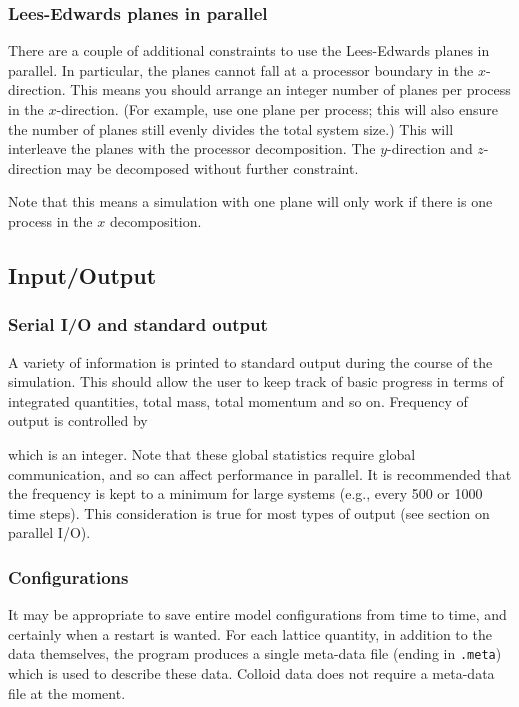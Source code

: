 \subsubsection{Lees-Edwards planes in parallel} 

There are a couple of additional constraints to use the Lees-Edwards
planes in parallel. In particular, the planes cannot fall at a
processor boundary in the $x$-direction. This means you should
arrange an integer number of planes per process in the $x$-direction.
(For example, use one plane per process; this will also ensure the number
of planes
still evenly divides the total system size.)
This will interleave the planes with the processor decomposition.
The $y$-direction and $z$-direction may be decomposed without
further constraint.

Note that this means a simulation with one plane will only work
if there is one process in the $x$ decomposition.

\subsection{Input/Output}

\subsubsection{Serial I/O and standard output}

A variety of information is printed to standard output during the
course of the simulation. This should allow the user to keep track
of basic progress in terms of integrated quantities, total mass,
total momentum and so on. Frequency of output is controlled by


which is an integer. Note that these global statistics require
global communication, and so can affect performance in parallel.
It is recommended that the frequency is kept to a minimum for
large systems (e.g., every 500 or 1000 time steps). This
consideration is true for most types of output (see section
on parallel I/O).

\subsubsection{Configurations}

It may be appropriate to save entire model configurations from
time to time, and certainly when a restart is wanted. For each lattice
quantity, in addition to the data themselves, the program produces a
single meta-data file (ending in
\texttt{.meta}) which is used to describe these data. Colloid
data does not require a meta-data file at the moment.


